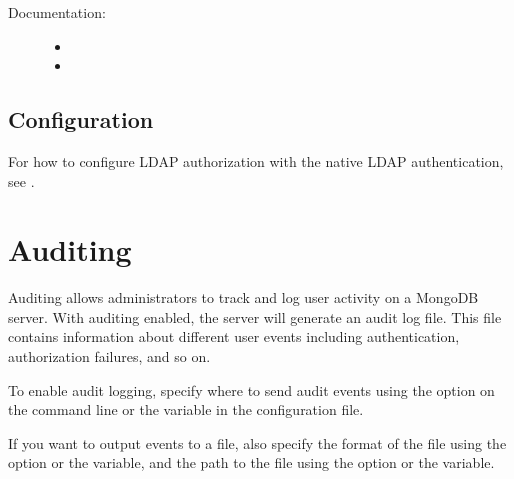 \documentclass[letterpaper,10pt,english]{sphinxmanual}
\begin{document}
\begin{description}
\item[{ Documentation:}] \leavevmode\begin{itemize}
\item {} 
\sphinxAtStartPar
{}

\item {} 
\sphinxAtStartPar
{}

\end{itemize}

\end{description}




\section{Configuration}
\label{\detokenize{authorization:configuration}}
\sphinxAtStartPar
For how to configure LDAP authorization with the native LDAP authentication, see {\hyperref[\detokenize{ldap-setup:ldap-setup}]{}}.


\chapter{Auditing}
\label{\detokenize{audit-logging:auditing}}\label{\detokenize{audit-logging:audit-log}}\label{\detokenize{audit-logging::doc}}
\sphinxAtStartPar
Auditing allows administrators to track
and log user activity on a MongoDB server.
With auditing enabled, the server will generate an audit log file.
This file contains information about different user events
including authentication, authorization failures, and so on.

\sphinxAtStartPar
To enable audit logging, specify where to send audit events
using the {\hyperref[\detokenize{audit-logging:cmdoption-auditDestination}]{}} option on the command line
or the  variable in the configuration file.

\sphinxAtStartPar
If you want to output events to a file,
also specify the format of the file
using the {\hyperref[\detokenize{audit-logging:cmdoption-auditFormat}]{}} option
or the  variable,
and the path to the file using the {\hyperref[\detokenize{audit-logging:cmdoption-auditPath}]{}} option
or the  variable.
\end{document}
